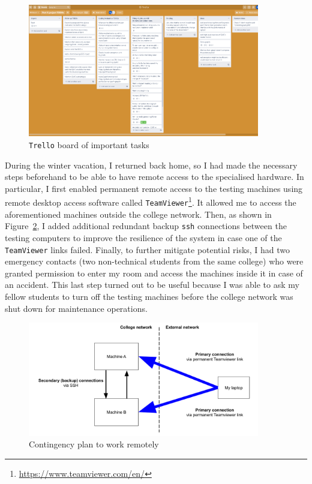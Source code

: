 \documentclass[12pt,a4paper]{report}
\begin{document}
    \begin{figure}[ht]
    \centering
    \includegraphics[width=0.9\textwidth]{figs/Trello_board.PNG}
    \caption{\texttt{Trello} board of important tasks}
    \label{fig:Trello_board}
    \end{figure}
    
    During the winter vacation, I returned back home, so I had made the necessary steps beforehand to be able to have remote access to the specialised hardware.
    In particular, I first enabled permanent remote access to the testing machines using remote desktop access software called \texttt{TeamViewer}\footnote{\url{https://www.teamviewer.com/en/}}.
    It allowed me to access the aforementioned machines outside the college network.
    Then, as shown in Figure~\ref{fig:setup_map}, I added additional redundant backup \texttt{ssh} connections between the testing computers to improve the resilience of the system in case one of the \texttt{TeamViewer} links failed.
    Finally, to further mitigate potential risks, I had two emergency contacts (two non-technical students from the same college) who were granted permission to enter my room and access the machines inside it in case of an accident.
    This last step turned out to be useful because I was able to ask my fellow students to turn off the testing machines before the college network was shut down for maintenance operations.
    

    \begin{figure}[ht]
    \centering
    \includegraphics[width=0.9\textwidth]{figs/Setup map.png}
    \caption[Contingency plan to work remotely]{Contingency plan to work remotely}
    \label{fig:setup_map}
    \end{figure}
\end{document}

